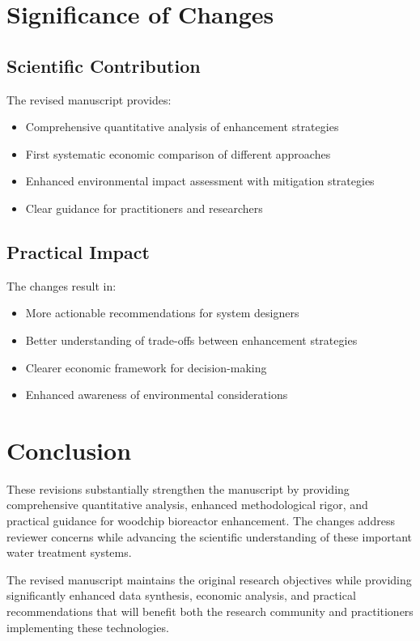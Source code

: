 \documentclass[12pt,a4paper]{article}
\begin{document}
\section{Significance of Changes}

\subsection{Scientific Contribution}
The revised manuscript provides:
\begin{itemize}[leftmargin=*, itemsep=0.2em]
\item Comprehensive quantitative analysis of enhancement strategies
\item First systematic economic comparison of different approaches
\item Enhanced environmental impact assessment with mitigation strategies
\item Clear guidance for practitioners and researchers
\end{itemize}

\subsection{Practical Impact}
The changes result in:
\begin{itemize}[leftmargin=*, itemsep=0.2em]
\item More actionable recommendations for system designers
\item Better understanding of trade-offs between enhancement strategies
\item Clearer economic framework for decision-making
\item Enhanced awareness of environmental considerations
\end{itemize}

\section{Conclusion}

These revisions substantially strengthen the manuscript by providing comprehensive quantitative analysis, enhanced methodological rigor, and practical guidance for woodchip bioreactor enhancement. The changes address reviewer concerns while advancing the scientific understanding of these important water treatment systems.

The revised manuscript maintains the original research objectives while providing significantly enhanced data synthesis, economic analysis, and practical recommendations that will benefit both the research community and practitioners implementing these technologies.
\end{document}
